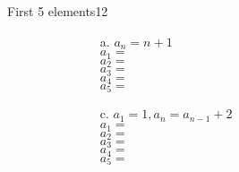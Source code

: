 \documentclass[a4paper,12pt]{book}
\begin{document}
    \hrulefill{}
    
    \begin{answersheetquestion}{2}{First 5 elements}{12}

    \begin{figure}[h]
        \centering
        \begin{subfigure}{.5\textwidth}
            \centering
            
            \begin{itemize}
                \item[a.] $a_{n} = n+1$ \\
                    $a_{1} = $ \iftoggle{answerkey}{ \begin{answer} 2 \end{answer} }{} \\
                    $a_{2} = $ \iftoggle{answerkey}{ \begin{answer} 3 \end{answer} }{} \\
                    $a_{3} = $ \iftoggle{answerkey}{ \begin{answer} 4 \end{answer} }{} \\
                    $a_{4} = $ \iftoggle{answerkey}{ \begin{answer} 5 \end{answer} }{} \\
                    $a_{5} = $ \iftoggle{answerkey}{ \begin{answer} 6 \end{answer} }{} \\
   
                \item[c.] $a_{1} = 1, a_{n} = a_{n-1} + 2$ \\
                    $a_{1} = $ \iftoggle{answerkey}{ \begin{answer} 1 \end{answer} }{} \\
                    $a_{2} = $ \iftoggle{answerkey}{ \begin{answer} 3 \end{answer} }{} \\
                    $a_{3} = $ \iftoggle{answerkey}{ \begin{answer} 5 \end{answer} }{} \\
                    $a_{4} = $ \iftoggle{answerkey}{ \begin{answer} 7 \end{answer} }{} \\
                    $a_{5} = $ \iftoggle{answerkey}{ \begin{answer} 9 \end{answer} }{} \\
            \end{itemize}
            

\end{subfigure}
\end{figure}
\end{answersheetquestion}
\end{document}
